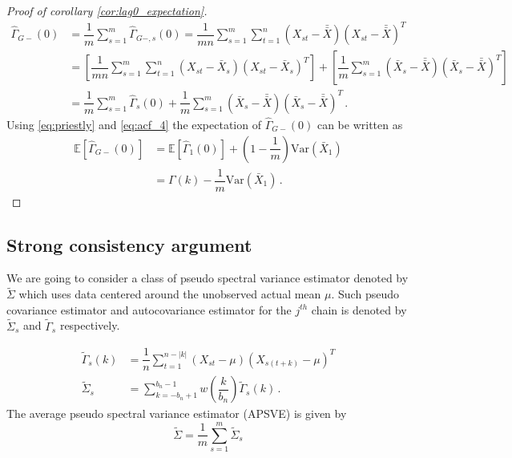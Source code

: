 \documentclass[11pt]{article}
\newcommand{\E}{\mathbb{E}}
\newcommand{\Var}{\text{Var}}
\theoremstyle{remark}
\begin{document}
\begin{proof}[Proof of corollary \ref{cor:lag0_expectation}]

\begin{align*}
    \hat{\Gamma}_{G-}(0) &= \dfrac{1}{m}\sum_{s=1}^{m}\hat{\Gamma}_{G-,s}(0) = \dfrac{1}{mn}\sum_{s=1}^{m}\sum_{t=1}^{n}  \left(X_{st} - \bar{\bar{X}}\right)  \left(X_{st} - \bar{\bar{X}}\right)^T\\
    &= \left[\dfrac{1}{mn}\sum_{s=1}^{m}\sum_{t=1}^{n} \left(X_{st} - \bar{X}_s \right)  \left(X_{st} - \bar{X}_s \right)^T\right] + \left[\dfrac{1}{m}\sum_{s=1}^{m} \left(\bar{X}_s - \bar{\bar{X}} \right) \left(\bar{X}_s - \bar{\bar{X}} \right)^T\right]\\
    &= \dfrac{1}{m}\sum_{s=1}^{m}\hat{\Gamma}_s(0)  + \dfrac{1}{m}\sum_{s=1}^{m} \left(\bar{X}_s - \bar{\bar{X}} \right)  \left(\bar{X}_s - \bar{\bar{X}} \right)^T\,.
\end{align*}
Using \eqref{eq:priestly} and \eqref{eq:acf_4} the expectation of $\hat{\Gamma}_{G-}(0)$ can be written as 
%
\begin{align*}
    \mathbb{E} \left[\hat{\Gamma}_{G-}(0) \right] &= \E\left[\hat{\Gamma}_1(0) \right] + \left(1-\dfrac{1}{m}\right)\Var(\bar{X}_1) \\
    & = \Gamma(k) - \dfrac{1}{m}\Var(\bar{X}_1)\,.
\end{align*}

\end{proof}


\subsection{Strong consistency argument} \label{appendix:strong_consis}


We are going to consider a class of pseudo spectral variance estimator denoted by $\tilde{\Sigma}$ which uses data centered around the unobserved actual mean $\mu$. Such pseudo covariance estimator and autocovariance estimator for the $j^{th}$ chain is denoted by $\tilde{\Sigma}_s$ and $\tilde{\Gamma}_s$ respectively.

\begin{align*}
    \tilde{\Gamma}_s(k) &= \dfrac{1}{n}\sum_{t=1}^{n-|k|}(X_{st}-\mu)(X_{s(t+k)}-\mu)^T \\ 
    \tilde{\Sigma}_s &= \sum_{k=-b_n+1}^{b_n-1}w\left(\dfrac{k}{b_n}\right)\tilde{\Gamma}_s(k) \,.
\end{align*}
%
The average pseudo spectral variance estimator (APSVE) is given by
\[
\tilde{\Sigma} = \dfrac{1}{m}\sum\limits_{s=1}^{m}\tilde{\Sigma}_s
\]
\end{document}
